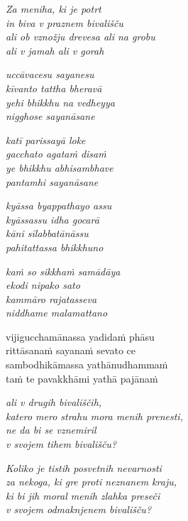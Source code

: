 \emph{Za meniha, ki je potrt}\\
\emph{in biva v praznem bivališču}\\
\emph{ali ob vznožju drevesa ali na grobu}\\
\emph{ali v jamah ali v gorah}


\clearpage

\emph{uccāvacesu sayanesu\\
kīvanto tattha bheravā}\\
\emph{yehi bhikkhu na vedheyya\\
nigghose sayanāsane}

\emph{katī parissayā loke\\
gacchato agataṁ disaṁ}\\
\emph{ye bhikkhu abhisambhave\\
pantamhi sayanāsane}

\emph{kyāssa byappathayo assu\\
kyāssassu idha gocarā}\\
\emph{kāni sīlabbatānāssu\\
pahitattassa bhikkhuno}

\emph{kaṁ so sikkhaṁ samādāya\\
ekodi nipako sato}\\
\emph{kammāro rajatasseva\\
niddhame malamattano}

vijigucchamānassa yadidaṁ phāsu\\
rittāsanaṁ sayanaṁ sevato ce\\
sambodhikāmassa yathānudhammaṁ\\
taṁ te pavakkhāmi yathā pajānaṁ


\clearpage

\emph{ali v drugih bivališčih,}\\
\emph{katero mero strahu mora menih prenesti,}\\
\emph{ne da bi se vznemiril}\\
\emph{v svojem tihem bivališču?}

\emph{Koliko je tistih posvetnih nevarnosti}\\
\emph{za nekoga, ki gre proti neznanem kraju,}\\
\emph{ki bi jih moral menih zlahka preseči}\\
\emph{v svojem odmaknjenem bivališču?}

